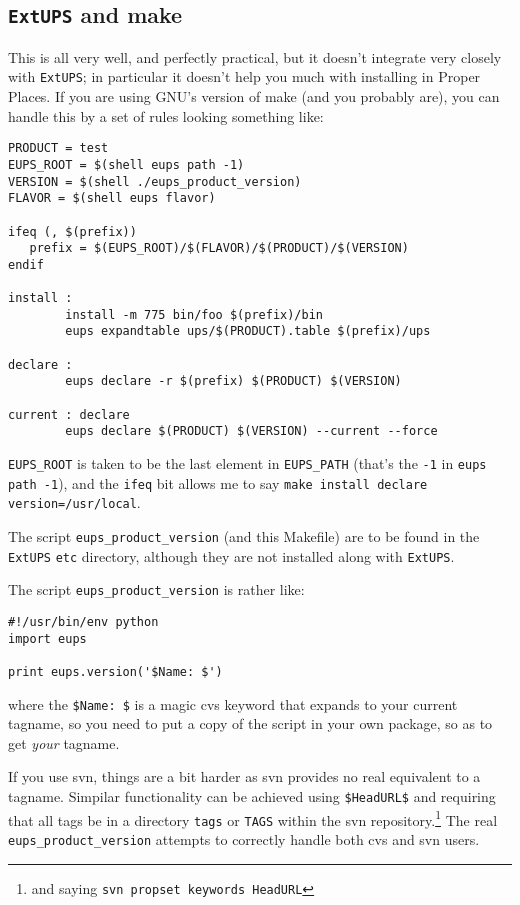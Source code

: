 \documentclass{article}
\newcommand{\code}[1]{\texttt{#1}}
\newcommand{\eups}{\code{ExtUPS}}
\begin{document}
\subsection{\eups{} and make}

This is all very well, and perfectly practical, but it doesn't
integrate very closely with \eups{}; in particular it doesn't
help you much with installing in Proper Places. If you are
using GNU's version of make (and you probably are), you can handle
this by a set of rules looking something like:
\begin{verbatim}
PRODUCT = test
EUPS_ROOT = $(shell eups path -1)
VERSION = $(shell ./eups_product_version)
FLAVOR = $(shell eups flavor)

ifeq (, $(prefix))
   prefix = $(EUPS_ROOT)/$(FLAVOR)/$(PRODUCT)/$(VERSION)
endif

install :
        install -m 775 bin/foo $(prefix)/bin
        eups expandtable ups/$(PRODUCT).table $(prefix)/ups

declare :
        eups declare -r $(prefix) $(PRODUCT) $(VERSION)
        
current : declare
        eups declare $(PRODUCT) $(VERSION) --current --force
\end{verbatim}                          %

\code{EUPS\_ROOT} is taken to be the last element in \code{EUPS\_PATH} (that's
the \code{-1} in \code{eups path -1}),
and the \code{ifeq} bit allows me to say \code{make install declare version=/usr/local}.

The script \code{eups\_product\_version} (and this Makefile) are to be found
in the \eups{} \code{etc} directory, although they are not installed along
with \eups{}.

The script \code{eups\_product\_version} is rather like:
\begin{verbatim}
#!/usr/bin/env python
import eups

print eups.version('$Name: $')
\end{verbatim}
where the \code{\$Name:  \$} is a magic cvs keyword that expands to your
current tagname, so you need to put a copy of the script in your own
package, so as to get \emph{your} tagname.

If you use svn, things are a bit harder as svn provides no real
equivalent to a tagname. Simpilar functionality can be achieved using \code{\$HeadURL\$}
and requiring that all tags be in a directory \code{tags}
or \code{TAGS} within the svn repository.\footnote{
  and saying \code{svn propset keywords HeadURL}}
The real \code{eups\_product\_version} attempts to correctly handle both cvs
and svn users.
\end{document}
